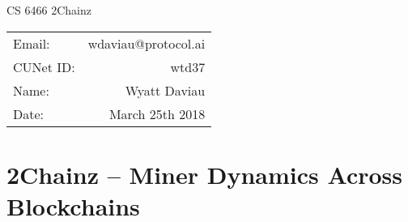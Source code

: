 \documentclass[12pt, preprint]{aastex}
\begin{document}
\begin{center}
{\Large CS 6466 2Chainz}


\begin{tabular}{lr}
Email: & wdaviau@protocol.ai \\
CUNet ID: & wtd37 \\
Name: & Wyatt Daviau \\
Date: & March 25th 2018 \\
\end{tabular}
\end{center}



\section*{2Chainz -- Miner Dynamics Across Blockchains}
\end{document}
